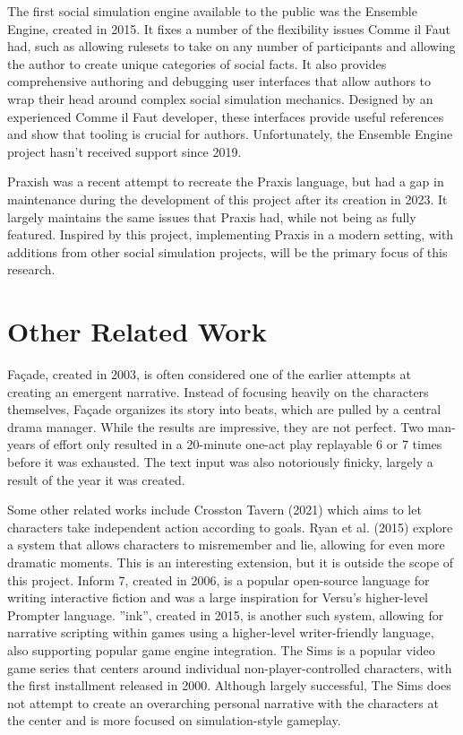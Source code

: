 The first social simulation engine available to the public was the Ensemble Engine,
created in 2015. \cite{samuel_ensemble_2015} It fixes a number of the flexibility
issues Comme il Faut had, such as allowing rulesets to take on any number of
participants and allowing the author to create unique categories of social facts.
It also provides comprehensive authoring and debugging user interfaces that allow
authors to wrap their head around complex social simulation mechanics. Designed by
an experienced Comme il Faut developer, these interfaces provide useful references
and show that tooling is crucial for authors. Unfortunately, the Ensemble Engine
project hasn’t received support since 2019.

Praxish was a recent attempt to recreate the Praxis language, but had a gap in
maintenance during the development of this project after its creation in 2023.
It largely maintains the same issues that Praxis had, while not being as fully featured.
\cite{dameris_praxish_2023} Inspired by this project, implementing Praxis in a
modern setting, with additions from other social simulation projects, will be the
primary focus of this research.

\section{Other Related Work} \label{sec:OtherRelatedWork}

Façade, created in 2003, is often considered one of the earlier attempts at creating an
emergent narrative. Instead of focusing heavily on the characters themselves, Façade
organizes its story into beats, which are pulled by a central drama manager. While
the results are impressive, they are not perfect. Two man-years of effort only resulted
in a 20-minute one-act play replayable 6 or 7 times before it was exhausted. The text
input was also notoriously finicky, largely a result of the year it was
created. \cite{mateas_facade_2003}

Some other related works include Crosston Tavern (2021) which aims to let characters
take independent action according to goals. \cite{oliver_crosston_2021} Ryan et al. (2015) explore a
system that allows characters to misremember and lie, allowing for even more dramatic
moments. \cite{ryan_toward_2015} This is an interesting extension, but it is outside the scope of
this project. Inform 7, created in 2006, is a popular open-source language for writing
interactive fiction and was a large inspiration for Versu’s higher-level Prompter
language. \cite{inform_7_inform_nodate} ”ink”, created in 2015, is another such system, allowing for narrative
scripting within games using a higher-level writer-friendly language, also supporting
popular game engine integration. \cite{noauthor_ink_nodate} The Sims is a popular video game series that
centers around individual non-player-controlled characters, with the first installment
released in 2000. \cite{arts_sims_2016} Although largely successful, The Sims does not attempt to
create an overarching personal narrative with the characters at the center and is more focused on
simulation-style gameplay.
